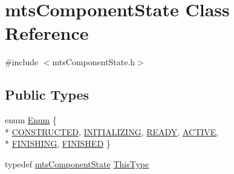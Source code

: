 \hypertarget{classmts_component_state}{}\section{mts\+Component\+State Class Reference}
\label{classmts_component_state}


{\ttfamily \#include $<$mts\+Component\+State.\+h$>$}

\subsection*{Public Types}
\begin{DoxyCompactItemize}
\item 
enum \hyperlink{classmts_component_state_a1158e4d2d79fff671354909e87f58928}{Enum} \{ \\*
\hyperlink{classmts_component_state_a1158e4d2d79fff671354909e87f58928acdca8190c67699a7982a3aefeefdac8e}{C\+O\+N\+S\+T\+R\+U\+C\+T\+E\+D}, 
\hyperlink{classmts_component_state_a1158e4d2d79fff671354909e87f58928a925e36faf39bd9ddc078621acb0d523c}{I\+N\+I\+T\+I\+A\+L\+I\+Z\+I\+N\+G}, 
\hyperlink{classmts_component_state_a1158e4d2d79fff671354909e87f58928a61548ba4ca876461d9bc7e6fef7b54a4}{R\+E\+A\+D\+Y}, 
\hyperlink{classmts_component_state_a1158e4d2d79fff671354909e87f58928a74c0603108e70255b42ec0eb1dd68931}{A\+C\+T\+I\+V\+E}, 
\\*
\hyperlink{classmts_component_state_a1158e4d2d79fff671354909e87f58928a9aa5dd15f4127016cec353e5afbcc592}{F\+I\+N\+I\+S\+H\+I\+N\+G}, 
\hyperlink{classmts_component_state_a1158e4d2d79fff671354909e87f58928a921eb9bc0ddc6cc0be548ad38471ab5d}{F\+I\+N\+I\+S\+H\+E\+D}
 \}
\item 
typedef \hyperlink{classmts_component_state}{mts\+Component\+State} \hyperlink{classmts_component_state_a668efaf1bf3c84a5448587f04d7312b5}{This\+Type}
\end{DoxyCompactItemize}
